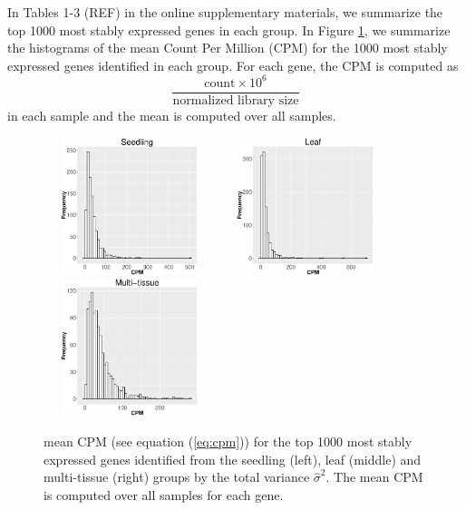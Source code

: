 \documentclass[11pt, a4paper]{article}
\begin{document}
In Tables 1-3 (REF) in the online supplementary materials, we summarize the
top 1000 most stably expressed genes in each group.  In Figure \ref{cpm}, we
summarize the histograms of the mean Count Per Million (CPM) for the 1000
most stably expressed genes identified in each group. For each gene, the CPM
is computed as
\begin{equation}\label{eq:cpm}
 \dfrac{ \text{count} \times 10^6 }{ \text{normalized library size}} 
\end{equation}
in each sample and the mean is computed over all samples.
 
\begin{figure}[] \begin{center}
    \includegraphics[width=5cm,height=4cm]{Figures/cpm_seedling.eps}
    \includegraphics[width=5cm,height=4cm]{Figures/cpm_leaves.eps}
    \includegraphics[width=5cm,height=4cm]{Figures/cpm_tissue.eps}
    \caption{{\small{\label{cpm} mean CPM (see equation (\ref{eq:cpm})) for the top 1000 most stably expressed genes identified from the seedling (left), leaf (middle) and multi-tissue
    (right) groups by the total variance $\hat{\sigma}^2$}}. The mean CPM is computed over all samples for each gene.} \end{center} 
\end{figure} 
\end{document}
